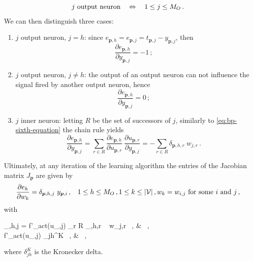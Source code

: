 \documentclass[11pt, a4paper]{report}
\numberwithin{equation}{chapter}
\theoremstyle{theorem}
\theoremstyle{definition}
\numberwithin{figure}{section}
\begin{document}
		\begin{equation*}
			\text{$j$ output neuron \hspace*{0.2cm} $\Leftrightarrow$ \hspace*{0.2cm} $1 \leq j \leq M_O$} \, .
		\end{equation*} 
		We can then distinguish three cases:
		\begin{enumerate}[label=(\roman*)]
			\item $j$ output neuron, $j = h$: since $e_{\boldsymbol{p},h} = e_{\boldsymbol{p},j} = t_{\boldsymbol{p},j} - y_{\boldsymbol{p},j}$, then 
			\begin{equation}
				\label{eq:jacobian-first-case}
				\dfrac{\partial e_{\boldsymbol{p},h}}{\partial y_{\boldsymbol{p},j}} = -1 \, ;
			\end{equation}
			\item $j$ output neuron, $j \neq h$: the output of an output neuron can not influence the signal fired by another output neuron, hence 
			\begin{equation}
				\label{eq:jacobian-second-case}
				\dfrac{\partial e_{\boldsymbol{p},h}}{\partial y_{\boldsymbol{p},j}} = 0 \, ;
			\end{equation}
			\item $j$ inner neuron: letting $R$ be the set of successors of $j$, similarly to \eqref{eq:bp-sixth-equation} the chain rule yields
			\begin{equation}
				\label{eq:jacobian-third-case}
				\dfrac{\partial e_{\boldsymbol{p},h}}{\partial y_{\boldsymbol{p},j}} = \sum_{r \in R} \dfrac{\partial e_{\boldsymbol{p},h}}{\partial u_{\boldsymbol{p},r}} ~ \dfrac{\partial u_{\boldsymbol{p},r}}{\partial y_{\boldsymbol{p},j}} = - \sum_{r \in R} \delta_{\boldsymbol{p},h,r} ~ w_{j,r} \, .
			\end{equation}
		\end{enumerate}
		
		Ultimately, at any iteration of the learning algorithm the entries of the Jacobian matrix $J_{\boldsymbol{p}}$ are given by
		\begin{equation*}
			\dfrac{\partial e_h}{\partial w_k} = \delta_{\boldsymbol{p},h,j} ~ y_{\boldsymbol{p},i} \, , \hspace*{0.3cm} 1 \leq h \leq M_O \, , 1 \leq k \leq |\mathcal{V}| \, , \text{$w_k = w_{i,j}$ for some $i$ and $j$} \, ,
		\end{equation*}
		with
		\begin{subnumcases}{\delta_{,h,j} =}
			\label{eq:levenberg-marquardt-inner-neuron}
		   	f'_{act}(u_{,j}) \sum_{r \in R} \delta_{,h,r} ~ w_{j,r} \, , &  \, , \\
		   	\label{eq:levenberg-marquardt-output-neuron}
			f'_{act}(u_{,j}) \delta_{jh}^K \, , &  \, ,
		\end{subnumcases}
		where $\delta_{jh}^K$ is the Kronecker delta. 
		
\end{document}

